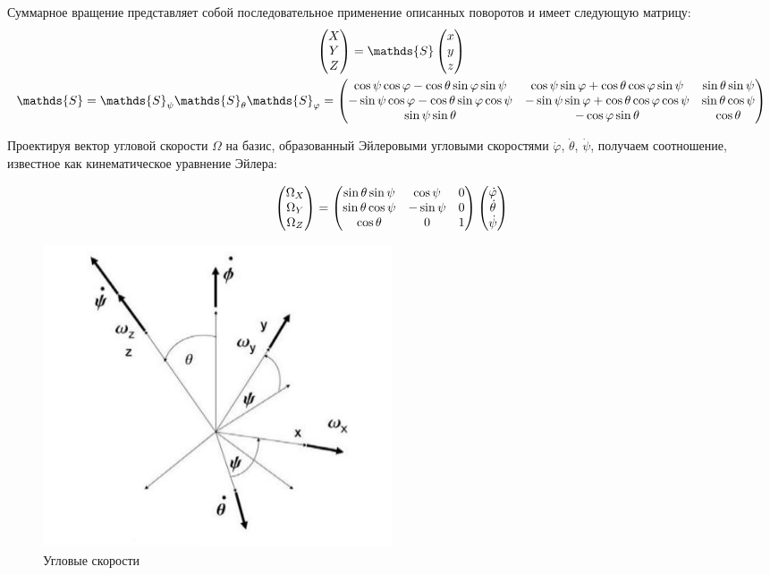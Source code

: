 \documentclass[12pt]{article}
\newcommand{\bbS}{\mathds{S}}
\begin{document}
Суммарное вращение представляет собой последовательное применение описанных поворотов и имеет следующую матрицу: 
\begin{gather}
\begin{pmatrix}
X \\
Y \\
Z
\end{pmatrix} = 
\bbS 
\begin{pmatrix}
x \\
y \\
z
\end{pmatrix} \notag \\
\bbS = \bbS_\psi \bbS_\theta \bbS_\varphi = 
\begin{pmatrix}
\cos \psi \cos \varphi - \cos \theta \sin \varphi \sin \psi & \cos \psi \sin \varphi + \cos \theta \cos \varphi \sin \psi & \sin \theta \sin \psi \\
- \sin \psi \cos \varphi - \cos \theta \sin \varphi \cos \psi & - \sin \psi \sin \varphi + \cos \theta \cos \varphi \cos \psi & \sin \theta \cos \psi \\
\sin \psi \sin \theta & - \cos \varphi \sin \theta & \cos \theta 
\end{pmatrix} \notag
\end{gather}

Проектируя вектор угловой скорости $\Omega$ на базис, образованный Эйлеровыми угловыми скоростями $\dot{\varphi}$, $\dot{\theta}$, $\dot{\psi}$, получаем соотношение, известное как кинематическое уравнение Эйлера:

\begin{gather}
\begin{pmatrix}
\Omega_X \\
\Omega_Y \\
\Omega_Z
\end{pmatrix} =
\begin{pmatrix}
\sin \theta \sin \psi & \cos \psi & 0 \\
\sin \theta \cos \psi & - \sin \psi & 0 \\
\cos \theta & 0 & 1
\end{pmatrix}
\begin{pmatrix}
\dot{\varphi} \\
\dot{\theta} \\
\dot{\psi}
\end{pmatrix} \notag
\end{gather}

\begin{figure}
  \centering
	\includegraphics[width=0.5\textwidth]{pictures/AngularVelocities.jpg}
	\caption{Угловые скорости}
	\label{fig:AngularVelocities}
\end{figure}
\end{document}
